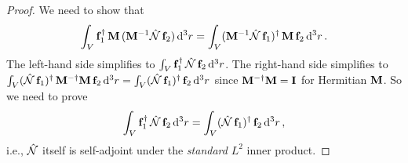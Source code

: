 \begin{proof}
We need to show that
\begin{equation}\label{eq:ch3-proof-target}
  \int_V \mathbf{f}_1^\dagger\,\mathbf{M}\,(\mathbf{M}^{-1}\hat{\mathcal{N}}\,\mathbf{f}_2)\,\mathrm{d}^3r
  = \int_V (\mathbf{M}^{-1}\hat{\mathcal{N}}\,\mathbf{f}_1)^\dagger\,\mathbf{M}\,\mathbf{f}_2\,\mathrm{d}^3r\,.
\end{equation}
The left-hand side simplifies to $\int_V\mathbf{f}_1^\dagger\,\hat{\mathcal{N}}\,\mathbf{f}_2\,\mathrm{d}^3r$.
The right-hand side simplifies to
$\int_V(\hat{\mathcal{N}}\,\mathbf{f}_1)^\dagger\,\mathbf{M}^{-\dagger}\mathbf{M}\,\mathbf{f}_2\,\mathrm{d}^3r
=\int_V(\hat{\mathcal{N}}\,\mathbf{f}_1)^\dagger\,\mathbf{f}_2\,\mathrm{d}^3r$
since $\mathbf{M}^{-\dagger}\mathbf{M}=\mathbf{I}$ for Hermitian $\mathbf{M}$.
So we need to prove
\begin{equation}\label{eq:ch3-maxop-sa}
  \int_V \mathbf{f}_1^\dagger\,\hat{\mathcal{N}}\,\mathbf{f}_2\,\mathrm{d}^3r
  = \int_V (\hat{\mathcal{N}}\,\mathbf{f}_1)^\dagger\,\mathbf{f}_2\,\mathrm{d}^3r\,,
\end{equation}
i.e., $\hat{\mathcal{N}}$ itself is self-adjoint under the \emph{standard} $L^2$
inner product.


\end{proof}
